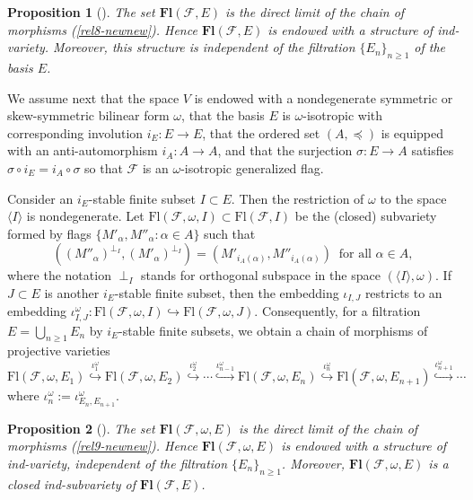 \documentclass[12pt]{amsart}
\newtheorem{proposition}{Proposition}
\theoremstyle{definition}
\begin{document}
\begin{proposition}[\cite{DP}]
\label{proposition-3-3-3}
The set $\mathbf{Fl}(\mathcal{F},E)$ is the direct limit of the chain of morphisms
(\ref{rel8-newnew}). Hence $\mathbf{Fl}(\mathcal{F},E)$ is endowed with a structure of ind-variety.
Moreover, this structure is independent of the filtration $\{E_n\}_{n\geq 1}$ of the basis $E$.
\end{proposition}

We assume next that the space $V$ is endowed with a nondegenerate symmetric or skew-symmetric bilinear form $\omega$, that the basis $E$ is $\omega$-isotropic with corresponding involution
$i_E:E\to E$, that the ordered set $(A,\preceq)$ is equipped with
an anti-automorphism $i_A:A\to A$,
and that the surjection $\sigma:E\to A$ satisfies $\sigma\circ i_E=i_A\circ\sigma$ so
that $\mathcal{F}$ is an $\omega$-isotropic generalized flag.

Consider an $i_E$-stable finite subset $I\subset E$. Then the restriction
of $\omega$ to the space $\langle I\rangle$ is nondegenerate.
Let $\mathrm{Fl}(\mathcal{F},\omega,I)\subset\mathrm{Fl}(\mathcal{F},I)$ be the (closed) subvariety formed by flags $\{M'_\alpha,M''_\alpha:\alpha\in A\}$ such that
\[((M''_\alpha)^{\perp_I},(M'_\alpha)^{\perp_I})=(M'_{i_A(\alpha)},M''_{i_A(\alpha)})\ \mbox{ for all $\alpha\in A$},\]
where the notation $\perp_I$ stands for orthogonal subspace in the space $(\langle I\rangle,\omega)$.
If $J\subset E$ is another $i_E$-stable finite subset, then the embedding $\iota_{I,J}$ restricts to an embedding
$\iota_{I,J}^\omega:\mathrm{Fl}(\mathcal{F},\omega,I)\hookrightarrow \mathrm{Fl}(\mathcal{F},\omega,J)$.
Consequently, for a filtration $E=\bigcup_{n\geq 1}E_n$ by $i_E$-stable finite subsets, we obtain a chain of morphisms of projective varieties
\begin{equation}
\label{rel9-newnew}
\mathrm{Fl}(\mathcal{F},\omega,E_1)
\stackrel{\iota^\omega_1}{\hookrightarrow} \mathrm{Fl}(\mathcal{F},\omega,E_2)
\stackrel{\iota^\omega_2}{\hookrightarrow}\cdots\stackrel{\iota^\omega_{n-1}}{\hookrightarrow}
\mathrm{Fl}(\mathcal{F},\omega,E_n)\stackrel{\iota^\omega_n}{\hookrightarrow} \mathrm{Fl}(\mathcal{F},\omega,E_{n+1})\stackrel{\iota^\omega_{n+1}}{\hookrightarrow}\cdots
\end{equation}
where $\iota^\omega_n:=\iota^\omega_{E_n,E_{n+1}}$.

\begin{proposition}[\cite{DP}]
\label{proposition-3-3-2}
The set $\mathbf{Fl}(\mathcal{F},\omega,E)$ is the direct limit of the chain of morphisms
(\ref{rel9-newnew}). Hence $\mathbf{Fl}(\mathcal{F},\omega,E)$ is endowed with a structure of ind-variety, independent of the filtration $\{E_n\}_{n\geq 1}$.
Moreover, $\mathbf{Fl}(\mathcal{F},\omega,E)$ is a closed ind-subvariety of $\mathbf{Fl}(\mathcal{F},E)$.
\end{proposition}
\end{document}
